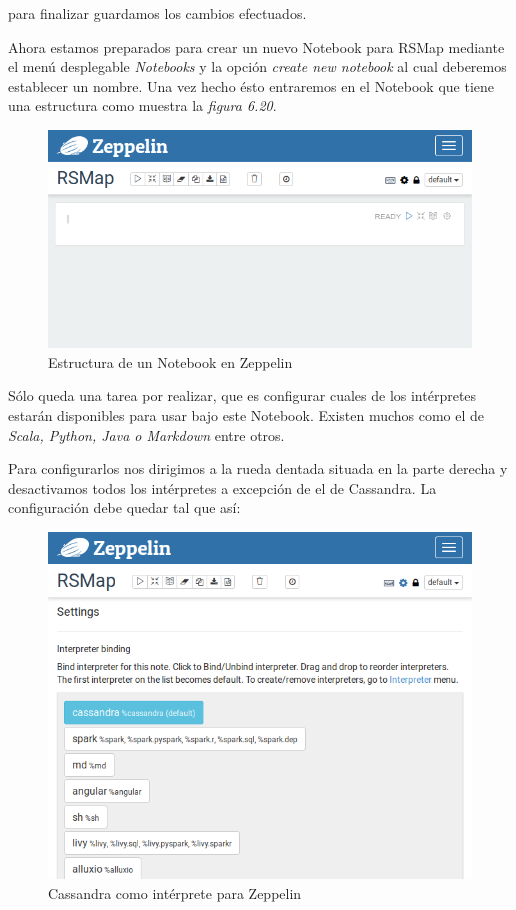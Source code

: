 para finalizar guardamos los cambios efectuados.

Ahora estamos preparados para crear un nuevo Notebook para RSMap mediante el menú desplegable \textit{Notebooks} y la opción \textit{create new notebook} al cual deberemos establecer un nombre. Una vez hecho ésto entraremos en el Notebook que tiene una estructura como muestra la \textit{figura 6.20}.

\begin{figure}[!ht]
  \begin{center}
    \includegraphics[scale=0.50]{../images/zeppelin/2.png}
		\caption{Estructura de un Notebook en Zeppelin}
    \label{fig:kaa}
	\end{center}
\end{figure}

Sólo queda una tarea por realizar, que es configurar cuales de los intérpretes estarán disponibles para usar bajo este Notebook.
Existen muchos como el de \textit{Scala, Python, Java o Markdown} entre otros.

Para configurarlos nos dirigimos a la rueda dentada situada en la parte derecha y desactivamos todos los intérpretes a excepción de el de Cassandra. La configuración debe quedar tal que así:

\begin{figure}[!ht]
  \begin{center}
    \includegraphics[scale=0.50]{../images/zeppelin/3.png}
		\caption{Cassandra como intérprete para Zeppelin}
    \label{fig:kaa}
	\end{center}
\end{figure}

